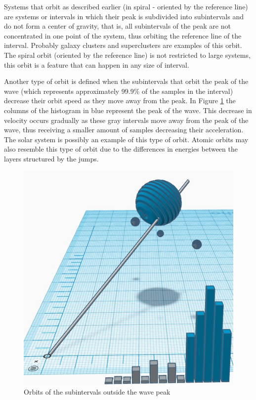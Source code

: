 Systems that orbit as described earlier (in spiral - oriented by the reference line) are systems or intervals in which their peak is subdivided into subintervals and do not form a center of gravity, that is, all subintervals of the peak are not concentrated in one point of the system, thus orbiting the reference line of the interval. Probably galaxy clusters and superclusters are examples of this orbit. The spiral orbit (oriented by the reference line) is not restricted to large systems, this orbit is a feature that can happen in any size of interval.

Another type of orbit is defined when the subintervals that orbit the peak of the wave (which represents approximately 99.9\% of the samples in the interval) decrease their orbit speed as they move away from the peak. In Figure \ref{fig:consciousness_elliptical_orbit_system} the columns of the histogram in blue represent the peak of the wave. This decrease in velocity occurs gradually as these gray intervals move away from the peak of the wave, thus receiving a smaller amount of samples decreasing their acceleration. The solar system is possibly an example of this type of orbit. Atomic orbits may also resemble this type of orbit due to the differences in energies between the layers structured by the jumps.  
	\begin{figure}[H]
	\caption{Orbits of the subintervals outside the wave peak}
	\label{fig:consciousness_elliptical_orbit_system}
	\centering
	\includegraphics[scale=.7]{sections/images/consciousness_elliptical_orbit_system.jpg}
	\end{figure}

